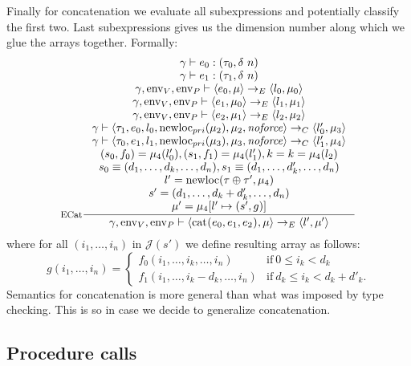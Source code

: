 \documentclass[a4paper, 10pt, draft]{report}
\DeclareMathOperator*{\env}{env}
\DeclareMathOperator*{\newloc}{newloc}
\newcommand{\mycode}[1]{\ensuremath{\mbox{\lstinline{#1}}}}
\begin{document}
Finally for concatenation we evaluate all subexpressions and potentially
classify the first two. Last subexpressions gives us the dimension number along which
we glue the arrays together. Formally:
\[ \inference[ECat]
{
  \gamma |- e_0 : \left(\tau_0, \delta\ n \right) \\
  \gamma |- e_1 : \left(\tau_1, \delta\ n \right) \\
  \gamma, \env_V, \env_P |- \left< e_0 , \mu \right> \to_E \left< l_0, \mu_0 \right> \\
  \gamma, \env_V, \env_P |- \left< e_1 , \mu_0 \right> \to_E \left< l_1, \mu_1 \right> \\
  \gamma, \env_V, \env_P |- \left< e_2 , \mu_1 \right> \to_E \left< l_2, \mu_2 \right> \\
  \gamma |- \left< \tau_1, e_0, l_0, \newloc_{pri}(\mu_2), \mu_2, \mathit{noforce} \right> \to_C \left<l'_0, \mu_3 \right> \\
  \gamma |- \left< \tau_0, e_1, l_1, \newloc_{pri}(\mu_3), \mu_3, \mathit{noforce} \right> \to_C \left<l'_1, \mu_4 \right> \\
  \left( s_0, f_0 \right) = \mu_4(l'_0), \left( s_1, f_1 \right) = \mu_4(l'_1), k = k = \mu_4(l_2) \\
  s_0 \equiv (d_1, \ldots, d_k, \ldots, d_n), s_1 \equiv (d_1, \ldots, d'_k, \ldots, d_n) \\
  l' = \newloc(\tau \oplus \tau', \mu_4) \\
  s' = (d_1,\ldots,d_k+d'_k,\ldots,d_n) \\
  \mu' = \mu_4[ l' \mapsto (s', g) ]
}{
  \gamma, \env_V, \env_P |- \left<\mycode{cat(} e_0, e_1, e_2 \mycode{)}, \mu \right> \to_E \left< l', \mu' \right>
}\]
where for all $(i_1,\ldots,i_n)$ in $\mathcal{J}(s')$ we define resulting array as follows: \[
    g(i_1,\ldots,i_n) = \begin{cases}
      f_0(i_1,\ldots,i_k,\ldots,i_n) & \text{if}\ 0 \leq i_k < d_k \\
      f_1(i_1,\ldots,i_k - d_k, \ldots, i_n) & \text{if}\ d_k \leq i_k < d_k + d'_k.
    \end{cases}
  \]
Semantics for concatenation is more general than what was imposed by type
checking. This is so in case we decide to generalize concatenation.

\subsection{Procedure calls}\label{sec:semantics:expr:proc}
\end{document}
